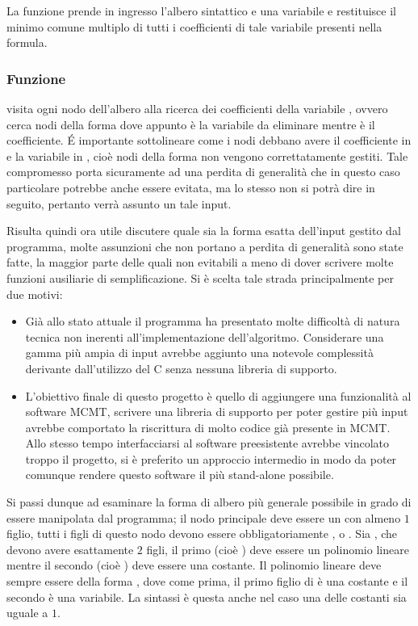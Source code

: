 \documentclass[11pt,letterpaper,twoside]{article}
\begin{document}
La funzione  prende in ingresso l'albero sintattico e una
variabile e restituisce il minimo comune multiplo di tutti i coefficienti di
tale variabile presenti nella formula.

\subsubsection{Funzione } 

 visita ogni nodo dell'albero alla ricerca dei coefficienti della
variabile , ovvero cerca nodi della forma  dove
appunto  è la variabile da eliminare mentre  è il
coefficiente. \'E importante sottolineare come i nodi debbano avere il
coefficiente in  e la variabile in , cioè
nodi della forma  non vengono correttatamente gestiti.  Tale
compromesso porta sicuramente ad una perdita di generalità che in questo caso
particolare potrebbe anche essere evitata, ma lo stesso non si potrà dire in
seguito, pertanto verrà assunto un tale input.

Risulta quindi ora utile discutere quale sia la forma esatta dell'input gestito
dal programma, molte assunzioni che non portano a perdita di generalità sono state
fatte, la maggior parte delle quali non evitabili a meno di dover scrivere molte
funzioni ausiliarie di semplificazione. Si è scelta tale strada principalmente
per due motivi:

\begin{itemize}
  \item Già allo stato attuale il programma ha presentato molte difficoltà di
natura tecnica non inerenti all'implementazione dell'algoritmo. Considerare una
gamma più ampia di input avrebbe aggiunto una notevole complessità derivante
dall'utilizzo del C senza nessuna libreria di supporto.
  \item L'obiettivo finale di questo progetto è quello di aggiungere una
funzionalità al software MCMT\autocite{mcmt}, scrivere una libreria di supporto
per poter gestire più input avrebbe comportato la riscrittura di molto codice
già presente in MCMT. Allo stesso tempo interfacciarsi al software preesistente
avrebbe vincolato troppo il progetto, si è preferito un approccio
intermedio in modo da poter comunque rendere questo software il più stand-alone
possibile.
\end{itemize}

Si passi dunque ad esaminare la forma di albero più generale possibile in grado
di essere manipolata dal programma; il nodo principale deve essere un
 con almeno $1$ figlio, tutti i figli di questo nodo devono essere
obbligatoriamente \inline{=}, \inline{>} o .  Sia \inline{=},
\inline{>} che  devono avere esattamente $2$ figli, il primo (cioè
) deve essere un polinomio lineare mentre il secondo (cioè
) deve essere una costante. Il polinomio lineare deve sempre
essere della forma , dove come
prima, il primo figlio di \inline{*} è una costante e il secondo è una
variabile. La sintassi è questa anche nel caso una delle costanti sia uguale a
$1$.
\end{document}
